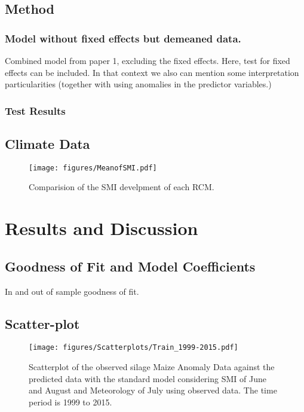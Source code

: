 \documentclass[12pt]{iopart}
\begin{document}
\subsection{Method}
\subsubsection{Model without fixed effects but demeaned data.}
Combined model from paper 1, excluding the fixed effects. Here, test for fixed effects can be included. In that context we also can mention some interpretation particularities (together with using anomalies in the predictor variables.)

\subsubsection{Test Results}

\subsection{Climate Data}
\begin{figure}
	\label{climateData:1f}
	\centering
	\texttt{[image: figures/MeanofSMI.pdf]}
	\caption{Comparision of the SMI develpment of each RCM.}
\end{figure}

\section{Results and Discussion}
\subsection{Goodness of Fit and Model Coefficients}
In and out of sample goodness of fit.

\subsection{Scatter-plot}

\label{scatter:1}

\begin{figure}
	\label{scatter:1f}
	\centering
	\texttt{[image: figures/Scatterplots/Train\_1999-2015.pdf]}
	\caption{Scatterplot of the observed silage Maize Anomaly Data against the predicted data with the standard model considering SMI of June and August and
		Meteorology of July using observed data. The time period is 1999 to 2015.}
\end{figure}
\end{document}
